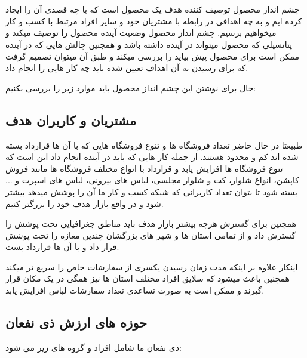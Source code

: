 \documentclass[12pt,a4paper]{article}
\begin{document}
\maketitle
\pagebreak
\tableofcontents
\pagebreak
\normalsize	
\section{} \label{section.productVision}


چشم انداز محصول توصیف کننده هدف یک محصول است که با چه قصدی آن را ایجاد کرده ایم و به چه اهدافی در رابطه با مشتریان خود و سایر افراد مرتبط با کسب و کار میخواهیم برسیم. چشم انداز محصول وضعیت آینده محصول را توصیف میکند و پتانسیلی که محصول میتواند در آینده داشته باشد و همجنین چالش هایی که در آینده ممکن است برای محصول پیش بیاید را بررسی میکند و طبق آن میتوان تصمیم گرفت که برای رسیدن به آن اهداف تعیین شده باید چه کار هایی را انجام داد.	
	
	
حال برای نوشتن این چشم انداز محصول باید موارد زیر را بررسی بکنیم:

	
\subsection{\textbf{مشتریان و کاربران هدف}} \label{section.productVision.customers}


طبیعتا در حال حاضر تعداد فروشگاه ها و تنوع فروشگاه هایی که با آن ها قرارداد بسته شده اند کم و محدود هستند. از جمله کار هایی که باید در آینده انجام داد این است که تنوع فروشگاه ها افزایش یابد و قرارداد با انواع مختلف فروشگاه ها مانند فروش کاپشن، انواع شلوار، کت و شلوار مجلسی، لباس های بیرونی، لباس های اسپرت و ... بسته شود تا بتوان تعداد کاربرانی که شبکه کسب و کار ما آن را پوشش میدهد بیشتر شود و در واقع بازار هدف خود را بزرگتر کنیم.


همچنین برای گسترش هرچه بیشتر بازار هدف باید مناطق جغرافیایی تحت پوشش را گسترش داد و از تمامی استان ها و شهر های بزرگشان چندین مغازه را تحت پوشش قرار داد و با آن ها قرارداد بست.


اینکار علاوه بر اینکه مدت زمان رسیدن یکسری از سفارشات خاص را سریع تر میکند همچنین باعث میشود که سلایق افراد مختلف استان ها نیز همگی در یک مکان قرار گیرند و ممکن است به صورت تساعدی تعداد سفارشات لباس افزایش یابد.


\subsection{\textbf{حوزه های ارزش ذی نفعان}} \label{section.productVision.areas}
	ذی نفعان ما شامل افراد و گروه های زیر می شود:
	
\end{document}
